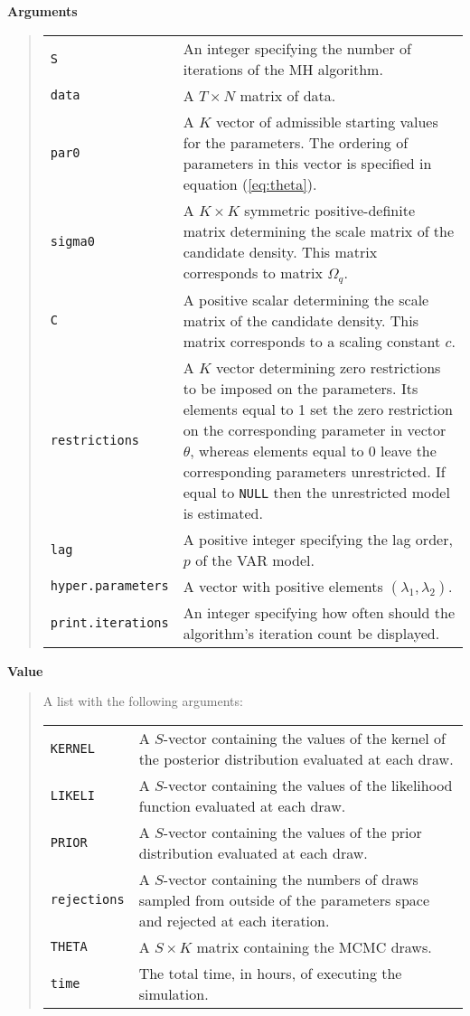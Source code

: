 \documentclass[final,3p,authoryear]{elsarticle}
\begin{document}
\bigskip\noindent\textbf{Arguments}
\begin{quote}
\begin{tabular}{p{3cm}p{10cm}}
\texttt{S} & An integer specifying the number of iterations of the MH algorithm. \\
\texttt{data}& A $T\times N$ matrix of data.\\
\texttt{par0}& A $K$ vector of admissible starting values for the parameters. The ordering of parameters in this vector is specified in equation (\ref{eq:theta}).\\
\texttt{sigma0}& A $K\times K$ symmetric positive-definite matrix determining the scale matrix of the candidate density. This matrix corresponds to matrix $\Omega_q$.\\
\texttt{C}& A positive scalar determining the scale matrix of the candidate density. This matrix corresponds to a scaling constant $c$.\\
\texttt{restrictions}& A $K$ vector determining zero restrictions to be imposed on the parameters. Its elements equal to 1 set the zero restriction on the corresponding parameter in vector $\theta$, whereas elements equal to 0 leave the corresponding parameters unrestricted. If equal to \texttt{NULL} then the unrestricted model is estimated.\\
\texttt{lag}& A positive integer specifying the lag order, $p$ of the VAR model.\\
\texttt{hyper.parameters}& A vector with positive elements $(\lambda_1,\lambda_2)$. \\
\texttt{print.iterations}& An integer specifying how often should the algorithm's iteration count be displayed.
\end{tabular}
\end{quote}

\bigskip\noindent\textbf{Value}
\begin{quote}
A list with the following arguments:

\smallskip\begin{tabular}{p{3cm}p{10cm}}
\texttt{KERNEL} & A $S$-vector containing the values of the kernel of the posterior distribution evaluated at each draw.\\
\texttt{LIKELI} & A $S$-vector containing the values of the likelihood function evaluated at each draw.\\
\texttt{PRIOR} & A $S$-vector containing the values of the prior distribution evaluated at each draw.\\
\texttt{rejections} & A $S$-vector containing the numbers of draws sampled from outside of the parameters space and rejected at each iteration.\\
\texttt{THETA} & A $S\times K$ matrix containing the MCMC draws.\\
\texttt{time} & The total time, in hours, of executing the simulation. \\
\end{tabular}
\end{quote}
\end{document}
